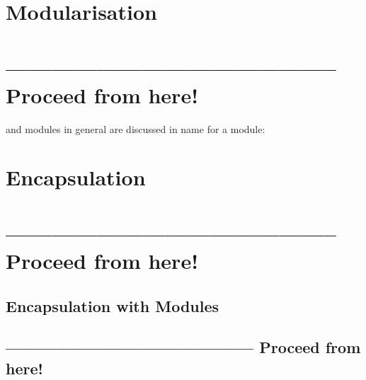 






\section{Modularisation}\label{sec:Modularisation}
\section{-------------------------------------------- Proceed from here!}
\lipsum[5]
 and modules in general are discussed in 
name for a module: 


\section{Encapsulation}
\section{-------------------------------------------- Proceed from here!}
\lipsum[5]


\subsection{Encapsulation with Modules}\label{sec:EncapsulationWithModules}
\subsection{-------------------------------------------- Proceed from here!}
\lipsum[5]

